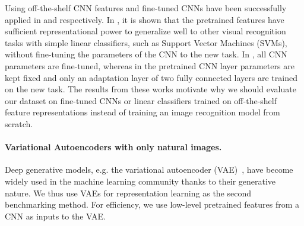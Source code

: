 Using off-the-shelf CNN features and fine-tuned CNNs have been successfully applied in  and  respectively.
In , it is shown that the pretrained features have sufficient representational power to generalize well to other visual recognition tasks with simple linear classifiers, such as Support Vector Machines (SVMs), without fine-tuning the parameters of the CNN to the new task. In , all CNN parameters are fine-tuned, whereas in  the pretrained CNN layer parameters are kept fixed and only an adaptation layer of two fully connected layers are trained on the new task. The results from these works motivate why we should evaluate our dataset on fine-tuned CNNs or linear classifiers trained on off-the-shelf feature representations instead of training an image recognition model from scratch. 

\vspace{-3mm}
\paragraph{Variational Autoencoders with only natural images.}
Deep generative models, 
e.g. the variational autoencoder (VAE)~, have become widely used in the machine learning community thanks to their generative nature. We thus use VAEs for representation learning as the second benchmarking method. For efficiency, we use low-level pretrained features from a CNN as inputs to the VAE.

